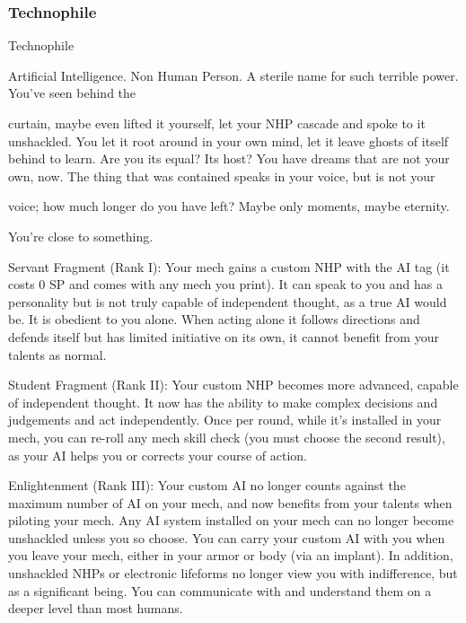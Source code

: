 \subsubsection{Technophile}

                                                  Technophile

Artificial Intelligence. Non Human Person. A sterile name for such terrible power. You’ve seen behind the

curtain, maybe even lifted it yourself, let your NHP cascade and spoke to it unshackled. You let it root
around in your own mind, let it leave ghosts of itself behind to learn. Are you its equal? Its host? You have
dreams that are not your own, now. The thing that was contained speaks in your voice, but is not your

voice; how much longer do you have left? Maybe only moments, maybe eternity.

You’re close to something.

Servant Fragment (Rank I): Your mech gains a custom NHP with the AI tag (it costs 0 SP and
comes with any mech you print). It can speak to you and has a personality but is not truly
capable of independent thought, as a true AI would be. It is obedient to you alone. When acting
alone it follows directions and defends itself but has limited initiative on its own, it cannot benefit
from your talents as normal.

Student Fragment (Rank II): Your custom NHP becomes more advanced, capable of
independent thought. It now has the ability to make complex decisions and judgements and act
independently. Once per round, while it’s installed in your mech, you can re-roll any mech skill
check (you must choose the second result), as your AI helps you or corrects your course of
action.

Enlightenment (Rank III): Your custom AI no longer counts against the maximum number of AI
on your mech, and now benefits from your talents when piloting your mech. Any AI system
installed on your mech can no longer become unshackled unless you so choose. You can carry
your custom AI with you when you leave your mech, either in your armor or body (via an implant).
In addition, unshackled NHPs or electronic lifeforms no longer view you with indifference, but as
a significant being. You can communicate with and understand them on a deeper level than most
humans.